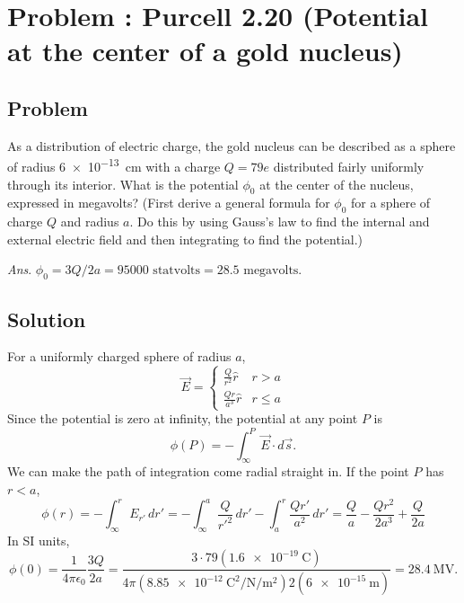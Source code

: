 \documentclass[solutions]{esg8022pset}
\begin{document}
\section{Problem \thesection: Purcell 2.20 (Potential at the center of a gold nucleus)}
\subsection{Problem}
  As a distribution of electric charge, the gold nucleus can be
  described as a sphere of radius \SI{6e-13}{\centi\meter} with a charge $Q = 79e$
  distributed fairly uniformly through its interior. What is the potential
  $\phi_0$ at the center of the nucleus, expressed in megavolts? (First derive
  a general formula for $\phi_0$ for a sphere of charge $Q$ and radius $a$. Do
  this by using Gauss's law to find the internal and external electric field
  and then integrating to find the potential.)
  \begin{flushright} \emph{Ans}. $\phi_0 = 3Q/2a = \num{95000}\text{ statvolts} = 28.5\text{ megavolts}$. \end{flushright}
\subsection{Solution}
  For a uniformly charged sphere of radius $a$,
  \[ \vec{E} = \begin{cases} \frac{Q}{r^2}\hat{r} & r>a \\ \frac{Qr}{a^3}\hat r & r\le a \end{cases} \]
  Since the potential is zero at infinity, the potential at any point $P$ is
  \[ \phi(P) = -\int_\infty^P \vec{E}\cdot d\vec s. \]
  We can make the path of integration come radial straight in. If the point $P$ has $r<a$,
  \[ \phi(r) = -\int_\infty^r E_{r'}\,dr' = -\int_\infty^a \frac{Q}{r'^2}\,dr' - \int_a^r\frac{Qr'}{a^2}\,dr' = \frac{Q}{a} - \frac{Qr^2}{2a^3} + \frac{Q}{2a} \]
  In SI units,
  \[ \phi(0) = \frac{1}{4\pi\epsilon_0}\frac{3Q}{2a} = \frac{3\cdot79(\SI{1.6e-19}{\coulomb})}{4\pi(\SI{8.85e-12}{\coulomb\squared\per\newton\per\meter\squared})2(\SI{6e-15}{\meter})} = \SI{28.4}{\mega\volt}. \]
\end{document}
